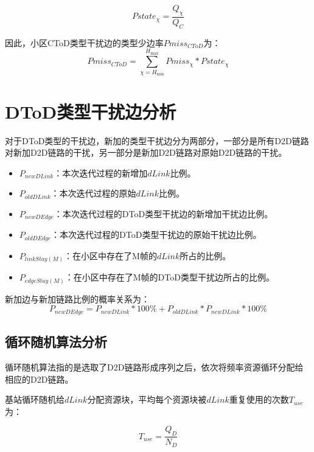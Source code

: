\documentclass[figurelist,tablelist,algorithmlist,nomlist,masters]{seuthesix}
\begin{document}
	\begin{equation}\label{eq3.1}
	Pstate_{\chi } = \frac{{Q_{\chi }}}{{Q_C}}
	\end{equation}
	
	因此，小区CToD类型干扰边的类型少边率$Pmiss_{CToD}$为：
	\begin{equation}\label{eq3.1}
	Pmiss_{CToD} = \sum\limits_{\chi = {H_{\min }}}^{{H_{\max }}} Pmiss_{\chi }*Pstate_{\chi }
	\end{equation}
	
	
	\section{DToD类型干扰边分析}
	对于DToD类型的干扰边，新加的类型干扰边分为两部分，一部分是所有D2D链路对新加D2D链路的干扰，另一部分是新加D2D链路对原始D2D链路的干扰。
	\begin{itemize}
		\item ${P_{newDLink}}$：本次迭代过程的新增加$dLink$比例。
		\item ${P_{oldDLink}}$：本次迭代过程的原始$dLink$比例。
		\item ${P_{newDEdge}}$：本次迭代过程的DToD类型干扰边的新增加干扰边比例。
		\item ${P_{oldDEdge}}$：本次迭代过程的DToD类型干扰边的原始干扰边比例。
		\item ${P_{linkStay(M)}}$：在小区中存在了M帧的$dLink$所占的比例。
		\item ${P_{edgeStay(M)}}$：在小区中存在了M帧的DToD类型干扰边所占的比例。
	\end{itemize}
	
	新加边与新加链路比例的概率关系为：
	\begin{equation}\label{eq3.1}
	{P_{newDEdge}} = {P_{newDLink}}*100\%  + {P_{oldDLink}}*{P_{newDLink}}*100\%
	\end{equation}
	
	\subsection{循环随机算法分析}
	
	循环随机算法指的是选取了D2D链路形成序列之后，依次将频率资源循环分配给相应的D2D链路。
	
	基站循环随机给$dLink$分配资源块，平均每个资源块被$dLink$重复使用的次数$T_{use}$为：
	
	\begin{equation}\label{eq3.1}
	T_{use} = \frac{{Q_D}}{{N_D}}
	\end{equation}
	
\end{document}
